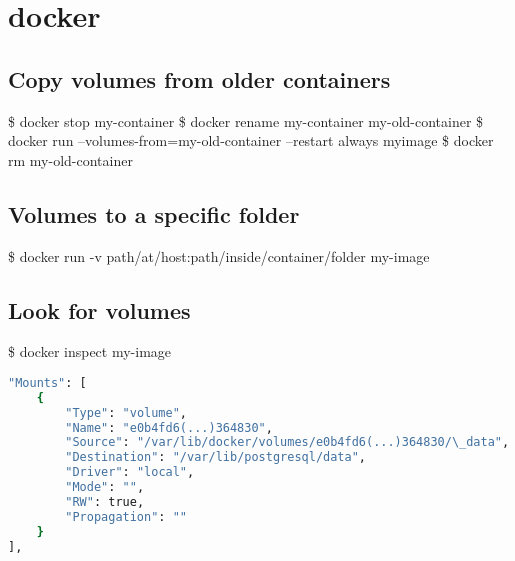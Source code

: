 \section{docker}
\subsection{Copy volumes from older containers}
\begin{displayquote}
\$ docker stop my-container \newline
\$ docker rename my-container my-old-container \newline
\$ docker run --volumes-from=my-old-container --restart always myimage \newline
\$ docker rm my-old-container
\end{displayquote}
\subsection{Volumes to a specific folder}
\begin{displayquote}
\$ docker run -v path/at/host:path/inside/container/folder my-image \newline
\end{displayquote}
\subsection{Look for volumes}
\begin{displayquote}
\$ docker inspect my-image \newline
\end{displayquote}
\begin{lstlisting}[language=Bash]
"Mounts": [
    {
        "Type": "volume",
        "Name": "e0b4fd6(...)364830",
        "Source": "/var/lib/docker/volumes/e0b4fd6(...)364830/\_data",
        "Destination": "/var/lib/postgresql/data",
        "Driver": "local",
        "Mode": "",
        "RW": true,
        "Propagation": ""
    }
],    
\end{lstlisting}
